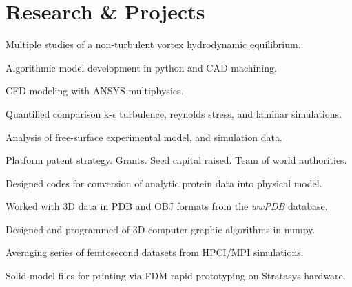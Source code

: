 \documentclass[letterpaper]{deedy-resume} %
\begin{document}
\hfill
\begin{minipage}[t]{1\textwidth} %


\section{Research \& Projects}




\vspace{\topsep} %
Multiple studies of a non-turbulent vortex hydrodynamic equilibrium.

\vspace{\topsep} %
\begin{tightitemize}
\item Algorithmic model development in python and CAD machining. 
\item CFD modeling with ANSYS multiphysics. 
\item Quantified comparison k-$\epsilon$ turbulence, reynolds stress, and laminar simulations.
\item Analysis of free-surface experimental model, and simulation data.
\item Platform patent strategy.  Grants. Seed capital raised. Team of world authorities.
\end{tightitemize}

\sectionspace %



\begin{tightitemize}
\item Designed codes for conversion of analytic protein data into physical model.
\item Worked with 3D data in PDB and OBJ formats from the \textit{wwPDB} database.
\item Designed and programmed of 3D computer graphic algorithms in numpy.
\item Averaging series of femtosecond datasets from HPCI/MPI simulations.
\item Solid model files for printing via FDM rapid prototyping on Stratasys hardware.
\end{tightitemize}


\end{minipage}
\end{document}
